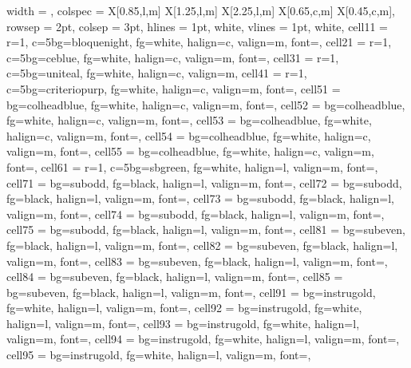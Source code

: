 \documentclass[a4paper,12pt]{article}
\begin{document}
\begin{longtblr}{
  width      = \textwidth,
  colspec    = {X[0.85,l,m] X[1.25,l,m] X[2.25,l,m] X[0.65,c,m] X[0.45,c,m]},
  rowsep     = 2pt,
  colsep     = 3pt,
  hlines     = {1pt, white},
  vlines     = {1pt, white},
  cell{1}{1} = {r=1, c=5}{bg=bloquenight, fg=white, halign=c, valign=m, font=\bfseries},
  cell{2}{1} = {r=1, c=5}{bg=ceblue, fg=white, halign=c, valign=m, font=\small\bfseries},
  cell{3}{1} = {r=1, c=5}{bg=uniteal, fg=white, halign=c, valign=m},
  cell{4}{1} = {r=1, c=5}{bg=criteriopurp, fg=white, halign=c, valign=m, font=\small\bfseries},
  cell{5}{1} = {bg=colheadblue, fg=white, halign=c, valign=m, font=\bfseries},
  cell{5}{2} = {bg=colheadblue, fg=white, halign=c, valign=m, font=\bfseries},
  cell{5}{3} = {bg=colheadblue, fg=white, halign=c, valign=m, font=\bfseries},
  cell{5}{4} = {bg=colheadblue, fg=white, halign=c, valign=m, font=\bfseries},
  cell{5}{5} = {bg=colheadblue, fg=white, halign=c, valign=m, font=\bfseries},
  cell{6}{1} = {r=1, c=5}{bg=sbgreen, fg=white, halign=l, valign=m, font=\small\bfseries},
  cell{7}{1} = {bg=subodd,  fg=black, halign=l, valign=m, font=\footnotesize},
  cell{7}{2} = {bg=subodd,  fg=black, halign=l, valign=m, font=\footnotesize},
  cell{7}{3} = {bg=subodd,  fg=black, halign=l, valign=m, font=\footnotesize},
  cell{7}{4} = {bg=subodd,  fg=black, halign=l, valign=m, font=\footnotesize},
  cell{7}{5} = {bg=subodd,  fg=black, halign=l, valign=m, font=\footnotesize},
  cell{8}{1} = {bg=subeven, fg=black, halign=l, valign=m, font=\footnotesize},
  cell{8}{2} = {bg=subeven, fg=black, halign=l, valign=m, font=\footnotesize},
  cell{8}{3} = {bg=subeven, fg=black, halign=l, valign=m, font=\footnotesize},
  cell{8}{4} = {bg=subeven, fg=black, halign=l, valign=m, font=\footnotesize},
  cell{8}{5} = {bg=subeven, fg=black, halign=l, valign=m, font=\footnotesize},
  cell{9}{1} = {bg=instrugold, fg=white, halign=l, valign=m, font=\footnotesize},
  cell{9}{2} = {bg=instrugold, fg=white, halign=l, valign=m, font=\footnotesize},
  cell{9}{3} = {bg=instrugold, fg=white, halign=l, valign=m, font=\footnotesize},
  cell{9}{4} = {bg=instrugold, fg=white, halign=l, valign=m, font=\footnotesize},
  cell{9}{5} = {bg=instrugold, fg=white, halign=l, valign=m, font=\footnotesize},
}
\end{longtblr}
\end{document}
